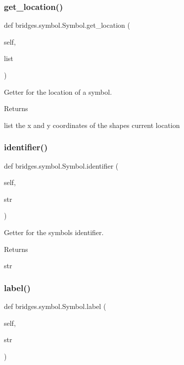 \subsubsection{\texorpdfstring{get\+\_\+location()}{get\_location()}}
{\footnotesize\ttfamily def bridges.\+symbol.\+Symbol.\+get\+\_\+location (\begin{DoxyParamCaption}\item[{}]{self,  }\item[{}]{list }\end{DoxyParamCaption})}



Getter for the location of a symbol. 

\begin{DoxyReturn}{Returns}


list the x and y coordinates of the shape\textquotesingle{}s current location 
\end{DoxyReturn}
\mbox{\label{classbridges_1_1symbol_1_1_symbol_ab6701b43acd3e24077b1bc385b35fdf1}} 
\subsubsection{\texorpdfstring{identifier()}{identifier()}}
{\footnotesize\ttfamily def bridges.\+symbol.\+Symbol.\+identifier (\begin{DoxyParamCaption}\item[{}]{self,  }\item[{}]{str }\end{DoxyParamCaption})}



Getter for the symbols identifier. 

\begin{DoxyReturn}{Returns}


str 
\end{DoxyReturn}
\mbox{\label{classbridges_1_1symbol_1_1_symbol_a6e29aa07da4ce5b13130ada2688685fc}} 
\subsubsection{\texorpdfstring{label()}{label()}\hspace{0.1cm}{\footnotesize\ttfamily [1/2]}}
{\footnotesize\ttfamily def bridges.\+symbol.\+Symbol.\+label (\begin{DoxyParamCaption}\item[{}]{self,  }\item[{}]{str }\end{DoxyParamCaption})}



